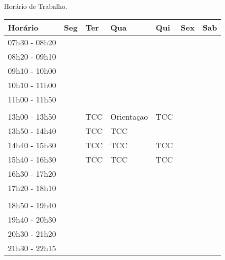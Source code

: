 \begin{quadro}[!htb]
    \caption{Horário de Trabalho.\label{qua:quadro2}}
    \begin{tabular}{|p{2.5cm}|p{1.8cm}|p{1.8cm}|p{1.8cm}|p{1.8cm}|p{1.8cm}|p{1.8cm}|}
        \hline
        \textbf{Horário} & \textbf{Seg} & \textbf{Ter} & \textbf{Qua} & \textbf{Qui} & \textbf{Sex} & \textbf{Sab} \\
        \hline
        \small{07h30 - 08h20} &   &   &   &   &   &   \\
        \hline
        \small{08h20 - 09h10} &   &   &   &   &   &   \\
        \hline
	\small{09h10 - 10h00} &   &   &  &  &   &   \\
        \hline
	\small{10h10 - 11h00} &   &   &   &   &  &   \\
        \hline
	\small{11h00 - 11h50} &   &   &   &   &   & \\
        \hline
	\small{} &   &   &   &   &   & \\
        \hline
	\small{13h00 - 13h50} &   & TCC & Orientaçao & TCC &   & \\
        \hline
	\small{13h50 - 14h40} &   & TCC & TCC &   &   & \\
        \hline
	\small{14h40 - 15h30} &   & TCC & TCC & TCC &   & \\
        \hline
	\small{15h40 - 16h30} &   & TCC & TCC & TCC &   & \\
        \hline
	\small{16h30 - 17h20} &   &   &   &   &   & \\
        \hline
	\small{17h20 - 18h10} &   &   &   &   &   & \\
        \hline
	\small{} &   &   &   &   &   & \\
	\hline
	\small{18h50 - 19h40} &   &   &   &   &   & \\
        \hline
	\small{19h40 - 20h30} &   &   &   &   &   & \\
        \hline
	\small{20h30 - 21h20} &   &   &   &   &   & \\
        \hline
	\small{21h30 - 22h15} &   &   &   &   &   & \\
        \hline
    \end{tabular}
\end{quadro}
